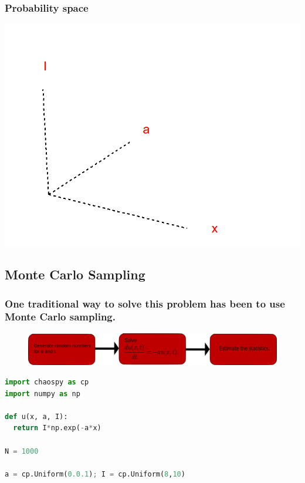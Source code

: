 \documentclass[handout]{beamer}
\begin{document}
\begin{frame}
  \frametitle{Probability space}
  \includegraphics[width=\textwidth]{probspace.png}
\end{frame}







\subsection{Monte Carlo Sampling}

\begin{frame}[fragile]
  \frametitle{One traditional way to solve this problem has been to use Monte Carlo sampling.}
    \begin{figure}
    \includegraphics[width=\textwidth]{MC.png}
  \end{figure}
  \pause
\begin{lstlisting}[language=python]
import chaospy as cp
import numpy as np

def u(x, a, I):
  return I*np.exp(-a*x)
    
N = 1000

a = cp.Uniform(0.0.1); I = cp.Uniform(8,10)
  
\end{lstlisting}
\end{frame}
\end{document}

